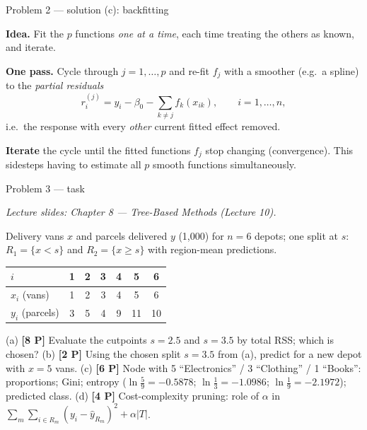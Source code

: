 \documentclass[aspectratio=169,11pt]{beamer}
\begin{document}
\begin{frame}{Problem 2 --- solution (c): backfitting}
  \begin{solutionbox}
    \textbf{Idea.} Fit the $p$ functions \emph{one at a time}, each time treating the others as
    known, and iterate.
    \medskip

    \textbf{One pass.} Cycle through $j=1,\dots,p$ and re-fit $f_j$ with a smoother (e.g.\ a
    spline) to the \emph{partial residuals}
    \[
      r_i^{(j)}=y_i-\beta_0-\sum_{k\ne j}f_k(x_{ik}),\qquad i=1,\dots,n,
    \]
    i.e.\ the response with every \emph{other} current fitted effect removed.
    \medskip

    \textbf{Iterate} the cycle until the fitted functions $f_j$ stop changing (convergence). This
    sidesteps having to estimate all $p$ smooth functions simultaneously.
  \end{solutionbox}
\end{frame}

\begin{frame}{Problem 3 --- task}
  \begin{exercise}
    {\scriptsize\itshape Lecture slides: Chapter 8 --- Tree-Based Methods (Lecture 10).}\par\smallskip
    Delivery vans $x$ and parcels delivered $y$ (1{,}000) for $n=6$ depots;
    one split at $s$: $R_1=\{x<s\}$ and $R_2=\{x\ge s\}$ with region-mean predictions.
    \begin{center}\scriptsize
    \begin{tabular}{lcccccc}
      \toprule
      $i$ & 1 & 2 & 3 & 4 & 5 & 6\\
      \midrule
      $x_i$ (vans) & 1 & 2 & 3 & 4 & 5 & 6\\
      $y_i$ (parcels) & 3 & 5 & 4 & 9 & 11 & 10\\
      \bottomrule
    \end{tabular}
    \end{center}
    (a) \textbf{[8 P]} Evaluate the cutpoints $s=2.5$ and $s=3.5$ by total RSS; which is chosen?
    (b) \textbf{[2 P]} Using the chosen split $s=3.5$ from (a), predict for a new depot with $x=5$ vans.
    (c) \textbf{[6 P]} Node with 5 ``Electronics'' / 3 ``Clothing'' / 1 ``Books'': proportions;
        Gini; entropy ($\ln\tfrac59=-0.5878$; $\ln\tfrac13=-1.0986$; $\ln\tfrac19=-2.1972$);
        predicted class.
    (d) \textbf{[4 P]} Cost-complexity pruning: role of $\alpha$ in
        $\sum_m\sum_{i\in R_m}(y_i-\hat y_{R_m})^2+\alpha|T|$.
  \end{exercise}
\end{frame}
\end{document}
